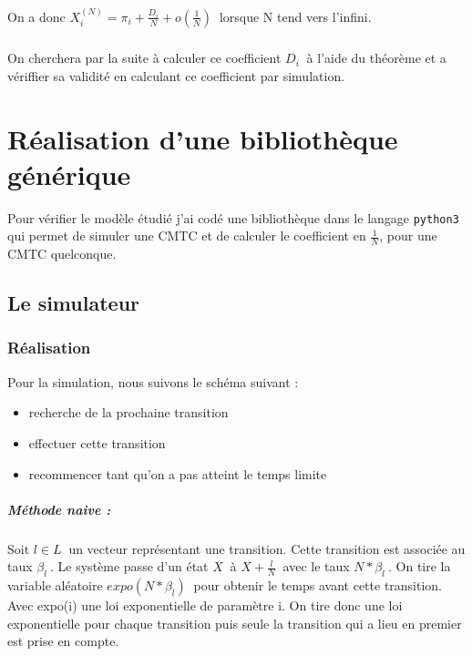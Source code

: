 \documentclass[a4paper,12pt]{report}
\def\D{\displaystyle}
\begin{document}
On a donc $\D X_i^{(N)}=\pi_i+\frac{D_i}{N}+o(\frac{1}{N})\ $ lorsque N
tend vers l'infini.

\paragraph{}
On cherchera par la suite à calculer ce coefficient $\D D_i\ $ à
l'aide du théorème et a vériffier sa validité en calculant ce
coefficient par simulation.

\chapter{Réalisation d'une bibliothèque générique}

Pour vérifier le modèle étudié j'ai codé une bibliothèque \cite{librairie} dans le
langage \texttt{python3} qui permet de simuler une CMTC et de calculer le
coefficient en $\D \frac{1}{N}$, pour une CMTC quelconque.

\section{Le simulateur}

\subsection{Réalisation}
Pour la simulation, nous suivons le schéma suivant :

\begin{itemize}
\item recherche de la prochaine transition
\item effectuer cette transition
\item recommencer tant qu'on a pas atteint le temps limite
\end{itemize}



\paragraph{Méthode naive :}

Soit $\D l \in L \ $ un vecteur représentant une transition. Cette
transition est associée au taux $\D \beta_l \ $. Le système passe d'un
état $\D X \ $ à $\D X+\frac{l}{N} \ $ avec le taux $\D N*\beta_l \ $. On tire
la variable aléatoire  $\D expo(N*\beta_l) \ $ pour obtenir le temps avant cette transition. Avec expo(i) une
loi exponentielle de paramètre i. On tire donc une loi exponentielle
pour chaque transition puis seule la transition qui a lieu en premier est
prise en compte. \\
\end{document}
